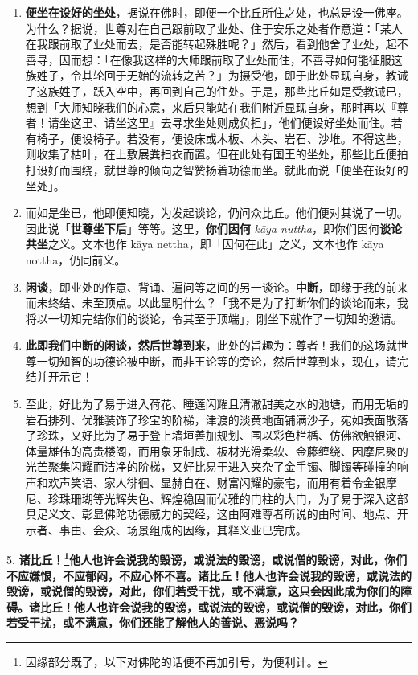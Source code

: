 \begin{enumerate}
\item \textbf{便坐在设好的坐处}，据说在佛时，即便一个比丘所住之处，也总是设一佛座。为什么？据说，世尊对在自己跟前取了业处、住于安乐之处者作意道：「某人在我跟前取了业处而去，是否能转起殊胜呢？」然后，看到他舍了业处，起不善寻，因而想：「在像我这样的大师跟前取了业处而住，不善寻如何能征服这族姓子，令其轮回于无始的流转之苦？」为摄受他，即于此处显现自身，教诫了这族姓子，跃入空中，再回到自己的住处。于是，那些比丘如是受教诫已，想到「大师知晓我们的心意，来后只能站在我们附近显现自身，那时再以『尊者！请坐这里、请坐这里』去寻求坐处则成负担」，他们便设好坐处而住。若有椅子，便设椅子。若没有，便设床或木板、木头、岩石、沙堆。不得这些，则收集了枯叶，在上敷展粪扫衣而置。但在此处有国王的坐处，那些比丘便拍打设好而围绕，就世尊的倾向之智赞扬着功德而坐。就此而说「便坐在设好的坐处」。
\item 而如是坐已，他即便知晓，为发起谈论，仍问众比丘。他们便对其说了一切。因此说「\textbf{世尊坐下后}」等等。这里，\textbf{你们因何} \textit{kāya nuttha}，即你们因何\textbf{谈论共坐}之义。文本也作 kāya nettha，即「因何在此」之义，文本也作 kāya nottha，仍同前义。
\item \textbf{闲谈}，即业处的作意、背诵、遍问等之间的另一谈论。\textbf{中断}，即缘于我的前来而未终结、未至顶点。以此显明什么？「我不是为了打断你们的谈论而来，我将以一切知完结你们的谈论，令其至于顶端」，刚坐下就作了一切知的邀请。
\item \textbf{此即我们中断的闲谈，然后世尊到来}，此处的旨趣为：尊者！我们的这场就世尊一切知智的功德论被中断，而非王论等的旁论，然后世尊到来，现在，请完结并开示它！
\item 至此，好比为了易于进入荷花、睡莲闪耀且清澈甜美之水的池塘，而用无垢的岩石排列、优雅装饰了珍宝的阶梯，津渡的淡黄地面铺满沙子，宛如表面散落了珍珠，又好比为了易于登上墙垣善加规划、围以彩色栏楯、仿佛欲触银河、体量雄伟的高贵楼阁，而用象牙制成、板材光滑柔软、金藤缠绕、因摩尼聚的光芒聚集闪耀而洁净的阶梯，又好比易于进入夹杂了金手镯、脚镯等碰撞的响声和欢声笑语、家人徘徊、显赫自在、财富闪耀的豪宅，而用有着令金银摩尼、珍珠珊瑚等光辉失色、辉煌稳固而优雅的门柱的大门，为了易于深入这部具足义文、彰显佛陀功德威力的契经，这由阿难尊者所说的由时间、地点、开示者、事由、会众、场景组成的因缘，其释义业已完成。\end{enumerate}

{\Large 5.} \textbf{诸比丘！\footnote{因缘部分既了，以下对佛陀的话便不再加引号，为便利计。}他人也许会说我的毁谤，或说法的毁谤，或说僧的毁谤，对此，你们不应嫌恨，不应郁闷，不应心怀不喜。诸比丘！他人也许会说我的毁谤，或说法的毁谤，或说僧的毁谤，对此，你们若受干扰，或不满意，这只会因此成为你们的障碍。诸比丘！他人也许会说我的毁谤，或说法的毁谤，或说僧的毁谤，对此，你们若受干扰，或不满意，你们还能了解他人的善说、恶说吗？}


